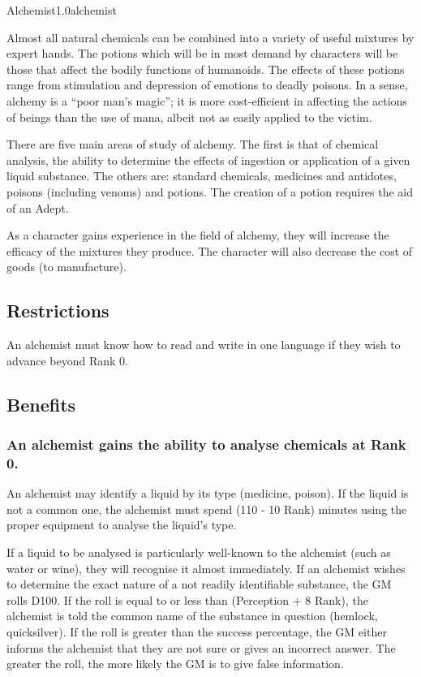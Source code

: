 \begin{skill}{Alchemist}{1.0}{alchemist}

Almost all natural chemicals can be combined into a variety of useful
mixtures by expert hands. The potions which will be in most demand by
characters will be those that affect the bodily functions of
humanoids.  The effects of these potions range from stimulation and
depression of emotions to deadly poisons.  In a sense, alchemy is a
``poor man's magic''; it is more cost-efficient in affecting the
actions of beings than the use of mana, albeit not as easily applied
to the victim.

There are five main areas of study of alchemy.  The first is that of
chemical analysis, the ability to determine the effects of ingestion
or application of a given liquid substance.  The others are: standard
chemicals, medicines and antidotes, poisons (including venoms) and
potions.  The creation of a potion requires the aid of an Adept.

As a character gains experience in the field of alchemy, they will
increase the efficacy of the mixtures they produce.  The character
will also decrease the cost of goods (to manufacture).

\subsection{Restrictions}

An alchemist must know how to read and write in one language if they
wish to advance beyond Rank 0.

\subsection{Benefits}

\subsubsection{An alchemist gains the ability to analyse chemicals at
Rank 0.}
\label{alchemist:analyse}

An alchemist may identify a liquid by its type (\eg medicine,
poison).  If the liquid is not a common one, the alchemist must spend
(110 - 10 \x Rank) minutes using the proper equipment to analyse the
liquid's type.

If a liquid to be analysed is particularly well-known to the alchemist
(such as water or wine), they will recognise it almost immediately.
If an alchemist wishes to determine the exact nature of a not readily
identifiable substance, the GM rolls D100.  If the roll is equal to or
less than (Perception + 8 \x Rank), the alchemist is told the common
name of the substance in question (\eg hemlock, quicksilver).  If
the roll is greater than the success percentage, the GM either informs
the alchemist that they are not sure or gives an incorrect answer.
The greater the roll, the more likely the GM is to give false
information.


\end{skill}
